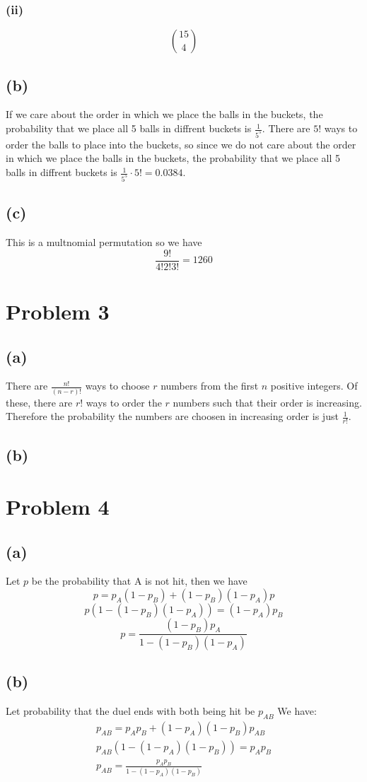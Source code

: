 \subsubsection*{(ii)}
$$\boxed{15 \choose 4}$$
\subsection*{(b)}
If we care about the order in which we place the balls in the buckets, the probability that we place all 5 balls in diffrent buckets is $\frac{1}{5^5}$.
There are $5!$ ways to order the balls to place into the buckets, so since we do not care about
the order in which we place the balls in the buckets, the probability that we place all 5 balls in diffrent buckets is $\frac{1}{5^5}\cdot5!=0.0384
$.
\subsection*{(c)}
This is a multnomial permutation so we have
$$\frac{9!}{4!2!3!}=\boxed{1260}$$

\section*{Problem 3}
\subsection*{(a)}
There are $\frac{n!}{(n-r)!}$ ways to choose $r$ numbers from the first $n$
positive integers. Of these, there are $r!$ ways to order the $r$ numbers
such that their order is increasing. Therefore the probability the numbers are choosen in increasing order
is just $\boxed{\frac{1}{r!}}$.
\subsection*{(b)}

\section*{Problem 4}
\subsection*{(a)}
Let $p$ be the probability that A is not hit, then we have
$$p=p_A(1-p_B)+(1-p_B)(1-p_A)p$$
$$p(1-(1-p_B)(1-p_A))=(1-p_A)p_B$$
$$p=\boxed{\frac{(1-p_B)p_A}{1-(1-p_B)(1-p_A)}}$$
\subsection*{(b)}
Let probability that the duel ends with both being hit be $p_{AB}$
We have:
\begin{align*}
    p_{AB}=p_Ap_B+(1-p_A)(1-p_B)p_{AB}\\
    p_{AB}\left(1-(1-p_A)(1-p_B)\right)=p_Ap_B\\
    p_{AB}=\boxed{\frac{p_Ap_B}{1-(1-p_A)(1-p_B)}}
\end{align*}
